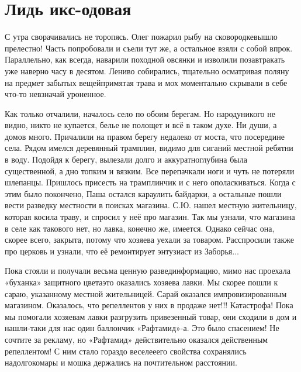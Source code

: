 \chapter{Лидь икс-одовая} 

С утра сворачивались не торопясь. Олег пожарил рыбу на сковородке\mdash вышло прелестно! Часть попробовали и съели тут же, а остальное взяли с собой впрок. Параллельно, как всегда, наварили походной овсянки и изволили позавтракать уже наверно часу в десятом. Лениво собирались, тщательно осматривая поляну на предмет забытых вещей\mdash примятая трава и мох моментально скрывали в себе что-то невзначай уроненное.

Как только отчалили, началось село по обоим берегам. Но народу\mdash никого не видно, никто не купается, белье не полощет и всё в таком духе. Ни души, а домов много. Причалили на правом берегу недалеко от моста, что посередине села. Рядом имелся деревянный трамплин, видимо для сиганий местной ребятни в воду. Подойдя к берегу, вылезали долго и аккуратно\mdash глубина была существенной, а дно топким и вязким.  Все перепачкали ноги и чуть не потеряли шлепанцы. Пришлось присесть на трамплинчик и с него ополаскиваться. Когда с этим было покончено, Паша остался караулить байдарки, а остальные пошли вести разведку местности в поисках магазина. С.Ю. нашел местную жительницу, которая косила траву, и спросил у неё про магазин. Так мы узнали, что магазина в селе как такового нет, но лавка, конечно же, имеется. Однако сейчас она, скорее всего, закрыта, потому что хозяева уехали за товаром. Расспросили также про церковь и узнали, что её ремонтирует энтузиаст из Заборья$\ldots$
 
Пока стояли и получали весьма ценную развединформацию, мимо нас проехала «буханка» защитного цвета\mdash это оказались хозяева лавки. Мы скорее пошли к сараю, указанному местной жительницей. Сарай оказался импровизированным магазином. Оказалось, что репеллентов у них в продаже нет!!! Катастрофа! Пока мы помогали хозяевам лавки разгрузить привезенный товар, они сходили в дом и нашли-таки для нас один баллончик «Рафтамид»-а. Это было спасением! Не сочтите за рекламу, но «Рафтамид» действительно оказался действенным репеллентом! С ним стало гораздо веселее\mdash его свойства сохранялись надолго\mdash комары и мошка держались на почтительном расстоянии. 

